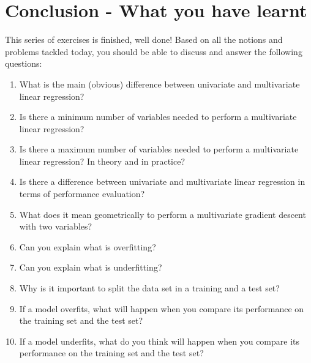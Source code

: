 \documentclass{42-en}
\begin{document}
\chapter{Conclusion - What you have learnt}

This series of exercises is finished, well done!
Based on all the notions and problems tackled today, you should be able to discuss and answer the following questions:

\begin{enumerate}
  \item What is the main (obvious) difference between univariate and multivariate linear regression?
  \item Is there a minimum number of variables needed to perform a multivariate linear regression?
  \item Is there a maximum number of variables needed to perform a multivariate linear regression?
        In theory and in practice?
  \item Is there a difference between univariate and multivariate linear regression in terms of performance evaluation?
  \item What does it mean geometrically to perform a multivariate gradient descent with two variables?
  \item Can you explain what is overfitting?
  \item Can you explain what is underfitting?
  \item Why is it important to split the data set in a training and a test set?
  \item If a model overfits, what will happen when you compare its performance on the training set and the test set?
  \item If a model underfits, what do you think will happen when you compare its performance on the training set and the test set?
\end{enumerate}
\newpage

\end{document}
